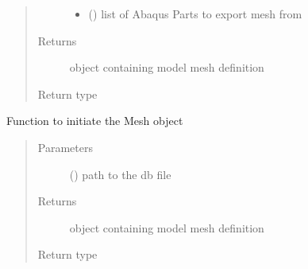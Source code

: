 \documentclass[letterpaper,10pt,english]{sphinxmanual}
\begin{document}
\begin{fulllineitems}
\begin{fulllineitems}
\begin{quote}
\begin{description}
\begin{itemize}
\item {} 
 () \textendash{} list of Abaqus Parts to export mesh from

\end{itemize}

\item[{Returns}] \leavevmode
object containing model mesh definition

\item[{Return type}] \leavevmode
{\hyperref[\detokenize{pyCofea/api:cofea.Mesh}]{}}

\end{description}\end{quote}

\end{fulllineitems}


\begin{fulllineitems}
\label{\detokenize{pyCofea/api:cofea.Mesh.importFromDbFile}}
Function to initiate the Mesh object
\begin{quote}\begin{description}
\item[{Parameters}] \leavevmode
{} () \textendash{} path to the db file

\item[{Returns}] \leavevmode
object containing model mesh definition

\item[{Return type}] \leavevmode
{\hyperref[\detokenize{pyCofea/api:cofea.Mesh}]{}}

\end{description}\end{quote}

\end{fulllineitems}



\end{fulllineitems}
\end{document}
